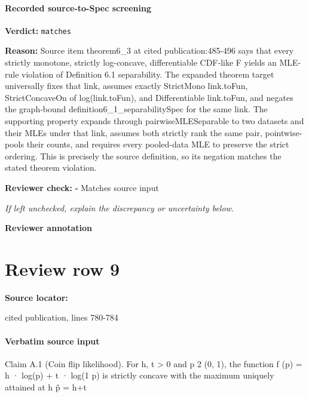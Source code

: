 \documentclass[10pt]{article}
\newcommand{\reviewerbox}{%
  \par\noindent\fbox{\parbox{0.96\linewidth}{\rule{0pt}{0.38in}}}\par
}
\newcommand{\reviewmatch}[1]{%
  \par\noindent\textbf{Reviewer check:} $\square$\; #1\par
  \noindent\emph{If left unchecked, explain the discrepancy or uncertainty below.}\par
}
\begin{document}
\paragraph{Recorded source-to-Spec screening}
\textbf{Verdict:} \texttt{matches}
\\
{\raggedright
\textbf{Reason:} Source item theorem6\_\allowbreak{}3 at cited publication:\allowbreak{}485-\allowbreak{}496 says that every strictly monotone, strictly log-\allowbreak{}concave, differentiable CDF-\allowbreak{}like F yields an MLE-\allowbreak{}rule violation of Definition 6.\allowbreak{}1 separability.\allowbreak{} The expanded theorem target universally fixes that link, assumes exactly StrictMono link.\allowbreak{}toFun, StrictConcaveOn of log(link.\allowbreak{}toFun), and Differentiable link.\allowbreak{}toFun, and negates the graph-\allowbreak{}bound definition6\_\allowbreak{}1\_\allowbreak{}separabilitySpec for the same link.\allowbreak{} The supporting property expands through pairwiseMLESeparable to two datasets and their MLEs under that link, assumes both strictly rank the same pair, pointwise-\allowbreak{}pools their counts, and requires every pooled-\allowbreak{}data MLE to preserve the strict ordering.\allowbreak{} This is precisely the source definition, so its negation matches the stated theorem violation.\allowbreak{}
\par}
\reviewmatch{Matches source input}
\noindent\textbf{Reviewer annotation}\par
\reviewerbox
\clearpage
\hypertarget{source-claim-2bd981124fb9e230}{}
\section*{Review row 9}
\textbf{Source locator:} {\footnotesize\raggedright cited publication, lines 780-\allowbreak{}784\par}
\paragraph{Verbatim source input}
\begin{ReviewVerbatim}
Claim A.1 (Coin flip likelihood). For h, t > 0 and p 2 (0, 1), the function f (p) = h · log(p) + t ·
log(1 p) is strictly concave with the maximum uniquely attained at
                                                                  h
                                                          p̂ =
                                                                 h+t
\end{ReviewVerbatim}
\end{document}
